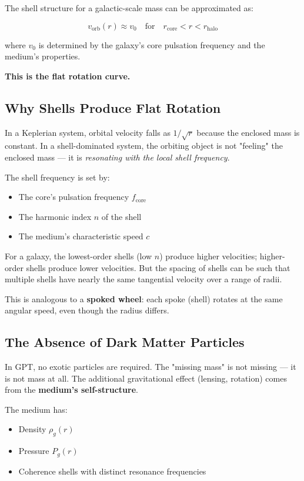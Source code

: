 \documentclass[12pt, a4paper]{article}
\begin{document}
The shell structure for a galactic-scale mass can be approximated as:

\[
v_{\text{orb}}(r) \approx v_0 \quad \text{for} \quad r_{\text{core}} < r < r_{\text{halo}}
\]

where \( v_0 \) is determined by the galaxy's core pulsation frequency and the medium's properties.

\textbf{This is the flat rotation curve.}

\subsection{Why Shells Produce Flat Rotation}
\label{subsec:shells_flat_rotation}

In a Keplerian system, orbital velocity falls as \( 1/\sqrt{r} \) because the enclosed mass is constant. In a shell-dominated system, the orbiting object is not "feeling" the enclosed mass — it is \textit{resonating with the local shell frequency}.

The shell frequency is set by:
\begin{itemize}
    \item The core's pulsation frequency \( f_{\text{core}} \)
    \item The harmonic index \( n \) of the shell
    \item The medium's characteristic speed \( c \)
\end{itemize}

For a galaxy, the lowest-order shells (low \( n \)) produce higher velocities; higher-order shells produce lower velocities. But the spacing of shells can be such that multiple shells have nearly the same tangential velocity over a range of radii.

This is analogous to a \textbf{spoked wheel}: each spoke (shell) rotates at the same angular speed, even though the radius differs.

\subsection{The Absence of Dark Matter Particles}
\label{subsec:no_dark_matter_particles}

In GPT, no exotic particles are required. The "missing mass" is not missing — it is not mass at all. The additional gravitational effect (lensing, rotation) comes from the \textbf{medium's self-structure}.

The medium has:
\begin{itemize}
    \item Density \( \rho_g(r) \)
    \item Pressure \( P_g(r) \)
    \item Coherence shells with distinct resonance frequencies
\end{itemize}
\end{document}
